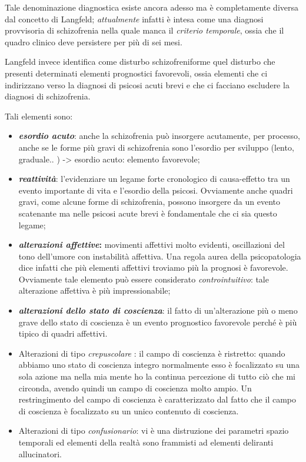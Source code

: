 \documentclass[]{article}
\begin{document}
Tale denominazione diagnostica esiste ancora adesso ma è completamente
diversa dal concetto di Langfeld; \emph{\emph{attualmente}} infatti è
intesa come una diagnosi provvisoria di schizofrenia nella quale manca
il \emph{criterio temporale}, ossia che il quadro clinico deve
persistere per più di sei mesi.

Langfeld invece identifica come disturbo schizofreniforme quel disturbo
che presenti determinati elementi prognostici favorevoli, ossia elementi
che ci indirizzano verso la diagnosi di psicosi acuti brevi e che ci
facciano escludere la diagnosi di schizofrenia.

Tali elementi sono:

\begin{itemize}
\item
  \textbf{\emph{esordio acuto}}: anche la schizofrenia può insorgere
  acutamente, per processo, anche se le forme più gravi di schizofrenia
  sono l'esordio per sviluppo (lento, graduale.. ) -\textgreater{}
  esordio acuto: elemento favorevole;
\item
  \textbf{\emph{reattività}}: l'evidenziare un legame forte cronologico
  di causa-effetto tra un evento importante di vita e l'esordio della
  psicosi. Ovviamente anche quadri gravi, come alcune forme di
  schizofrenia, possono insorgere da un evento scatenante ma nelle
  psicosi acute brevi è fondamentale che ci sia questo legame;
\item
  \textbf{\emph{alterazioni affettive}:} movimenti affettivi molto
  evidenti, oscillazioni del tono dell'umore con instabilità affettiva.
  Una regola aurea della psicopatologia dice infatti che più elementi
  affettivi troviamo più la prognosi è favorevole. Ovviamente tale
  elemento può essere considerato \emph{controintuitivo}: tale
  alterazione affettiva è più impressionabile;
\item
  \textbf{\emph{alterazioni dello stato di coscienza}}: il fatto di
  un'alterazione più o meno grave dello stato di coscienza è un evento
  prognostico favorevole perché è più tipico di quadri affettivi.
\end{itemize}

\begin{itemize}
\item
  Alterazioni di tipo \emph{\emph{crepuscolare}} : il campo di coscienza
  è ristretto: quando abbiamo uno stato di coscienza integro normalmente
  esso è focalizzato su una sola azione ma nella mia mente ho la
  continua percezione di tutto ciò che mi circonda, avendo quindi un
  campo di coscienza molto ampio. Un restringimento del campo di
  coscienza è caratterizzato dal fatto che il campo di coscienza è
  focalizzato su un unico contenuto di coscienza.
\item
  Alterazioni di tipo \emph{\emph{confusionario}}: vi è una distruzione
  dei parametri spazio temporali ed elementi della realtà sono frammisti
  ad elementi deliranti allucinatori.
\end{itemize}
\end{document}
